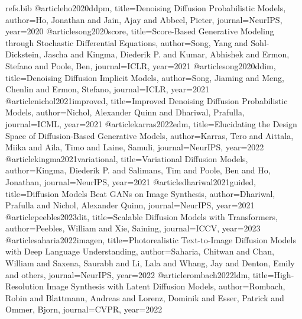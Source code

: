\begin{filecontents*}{refs.bib}
@article{ho2020ddpm,
  title={Denoising Diffusion Probabilistic Models},
  author={Ho, Jonathan and Jain, Ajay and Abbeel, Pieter},
  journal={NeurIPS},
  year={2020}
}
@article{song2020score,
  title={Score-Based Generative Modeling through Stochastic Differential Equations},
  author={Song, Yang and Sohl-Dickstein, Jascha and Kingma, Diederik P. and Kumar, Abhishek and Ermon, Stefano and Poole, Ben},
  journal={ICLR},
  year={2021}
}
@article{song2020ddim,
  title={Denoising Diffusion Implicit Models},
  author={Song, Jiaming and Meng, Chenlin and Ermon, Stefano},
  journal={ICLR},
  year={2021}
}
@article{nichol2021improved,
  title={Improved Denoising Diffusion Probabilistic Models},
  author={Nichol, Alexander Quinn and Dhariwal, Prafulla},
  journal={ICML},
  year={2021}
}
@article{karras2022edm,
  title={Elucidating the Design Space of Diffusion-Based Generative Models},
  author={Karras, Tero and Aittala, Miika and Aila, Timo and Laine, Samuli},
  journal={NeurIPS},
  year={2022}
}
@article{kingma2021variational,
  title={Variational Diffusion Models},
  author={Kingma, Diederik P. and Salimans, Tim and Poole, Ben and Ho, Jonathan},
  journal={NeurIPS},
  year={2021}
}
@article{dhariwal2021guided,
  title={Diffusion Models Beat GANs on Image Synthesis},
  author={Dhariwal, Prafulla and Nichol, Alexander Quinn},
  journal={NeurIPS},
  year={2021}
}
@article{peebles2023dit,
  title={Scalable Diffusion Models with Transformers},
  author={Peebles, William and Xie, Saining},
  journal={ICCV},
  year={2023}
}
@article{saharia2022imagen,
  title={Photorealistic Text-to-Image Diffusion Models with Deep Language Understanding},
  author={Saharia, Chitwan and Chan, William and Saxena, Saurabh and Li, Lala and Whang, Jay and Denton, Emily and others},
  journal={NeurIPS},
  year={2022}
}
@article{rombach2022ldm,
  title={High-Resolution Image Synthesis with Latent Diffusion Models},
  author={Rombach, Robin and Blattmann, Andreas and Lorenz, Dominik and Esser, Patrick and Ommer, Bjorn},
  journal={CVPR},
  year={2022}
}
\end{filecontents*}

\documentclass{article}
\usepackage[preprint]{neurips_2024}
\usepackage[utf8]{inputenc}
\usepackage[T1]{fontenc}
\usepackage{hyperref}
\usepackage{url}
\usepackage{booktabs}
\usepackage{amsfonts}
\usepackage{nicefrac}
\usepackage{microtype}
\usepackage{xcolor}
\usepackage{amsmath,amssymb}
\usepackage{graphicx}

\newcommand{\placeholder}[1]{\textcolor{red}{#1}}

